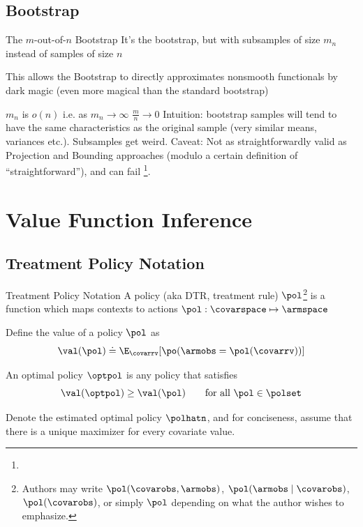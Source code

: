 \documentclass[aspectratio=169, professionalfonts]{beamer}
\begin{document}
\subsection{\mon Bootstrap}

\begin{frame}{The $m$-out-of-$n$ Bootstrap}
	It's the bootstrap, but with subsamples of size $m_n$ instead of samples of size $n$
	\vfill \pause

	This allows the \mon Bootstrap to directly approximates nonsmooth
	functionals by dark magic (even more magical than the standard bootstrap)

	$m_n$ is $o(n)$ i.e. as $m_n \to \infty$ $\frac{m}{n} \to 0$
	\vfill
	Intuition: bootstrap samples will tend to have the same characteristics as
	the original sample (very similar means, variances etc.). Subsamples get
	weird.
	\vfill \pause
	Caveat: Not as straightforwardly valid as Projection and Bounding approaches
	(modulo a certain definition of ``straightforward''), and can fail
	\footnote<3->{}.
\end{frame}
\section{Value Function Inference}

\subsection{Treatment Policy Notation}

\begin{frame}{Treatment Policy Notation}
	A policy (aka DTR, treatment rule) $\pol$\footnote{	Authors may write $\pol(\covarobs,
			\armobs)$, $\pol(\armobs \mid \covarobs)$, $\pol(\covarobs)$, or
		simply $\pol$ depending on what the author wishes to emphasize.
	} is a function which maps contexts to actions $\pol: \covarspace
		\mapsto \armspace$



	\vfill \pause
	Define the value of a policy $\pol$ as
	\begin{equation*}
		\val(\pol) \doteq \E_{\covarrv}[\po(\armobs = \pol(\covarrv))]
	\end{equation*}

	\vfill \pause
	An optimal policy $\optpol$ is any policy that satisfies
	\begin{equation*}
		\val(\optpol) \geq \val(\pol) \qquad \text{for all }\pol \in
		\polset
	\end{equation*}

	\vfill \pause
	Denote the estimated optimal policy $\polhatn$, and for conciseness, assume
	that there is a unique maximizer for every covariate value.

\end{frame}
\end{document}
